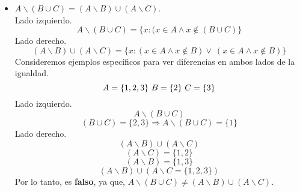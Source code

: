 \documentclass{article}
\theoremstyle{definition}
\begin{document}
\begin{enumerate}
\begin{itemize}
      \item $A\smallsetminus(B\cup C)=(A\smallsetminus B)\cup(A\smallsetminus C)$.\\
      Lado izquierdo.
      $$A \smallsetminus (B \cup C)=\{x:(x\in A \wedge x\notin (B \cup C)\}$$
      Lado derecho.
      $$(A \smallsetminus B)\cup(A \smallsetminus C)=\{x: (x\in A \wedge x\notin B)\lor\ (x\in A \wedge x\notin B)\}$$
      Consideremos ejemplos específicos para ver diferencias en ambos lados de la igualdad. 
      $$A=\{1,2,3\} \\\\\\\ B=\{2\} \\\\\\\ C=\{3\}$$
      Lado izquierdo.
      $$A \smallsetminus(B \cup C)$$
      $$(B \cup C) =\{2,3\} \Longrightarrow A\smallsetminus (B\cup C)=\{1\}$$
      Lado derecho. 
      $$(A \smallsetminus B)\cup (A \smallsetminus C)$$
      $$(A \smallsetminus C)=\{1,2\}$$
      $$(A \smallsetminus B)=\{1,3\}$$
      $$(A \smallsetminus B)\cup (A \smallsetminus C =\{1,2,3\})$$
      Por lo tanto, es \textbf{falso}, ya que, $A \smallsetminus (B\cup C)\neq (A \smallsetminus B)\cup (A \smallsetminus C)$. 
      
 
  \end{itemize}

\end{enumerate}
\end{document}
